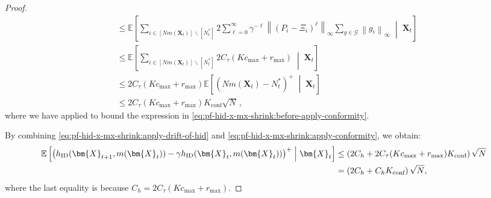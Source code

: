 \documentclass{article}
\theoremstyle{plain}
\theoremstyle{remark}
\newcommand{\norm}[1]{\left\lVert#1\right\rVert}
\newcommand{\givenmiddle}{\;\middle|\;}
\newcommand{\sumell}{\sum_{\ell=0}^\infty}
\newcommand{\Ctau}{C_\tau}
\newcommand{\ID}{\textnormal{ID}}
\newcommand{\conf}{\text{conf}}
\def\mX{{\bm{X}}}
\newcommand{\EE}{\mathbb{E}}
\newcommand{\bracket}[1]{\left(#1\right)}
\newcommand{\mbracket}[1]{\left[#1\right]}
\begin{document}
\begin{proof}
\begin{align}
        \nonumber
        &\leq \EE\mbracket{\sum_{i\in[Nm(\mX_t)]\backslash[N_t^*]} 2 \sumell \gamma^{-\ell}\norm{(P_i-\Xi_i)^{\ell}}_\infty \sum_{g\in \mathcal{G}}\norm{g_i}_\infty \givenmiddle\mX_t}\\
        \nonumber
        &\leq \EE\mbracket{\sum_{i\in[Nm(\mX_t)]\backslash[N_t^*]}2\Ctau(Kc_{\max}+r_{\max})\givenmiddle\mX_t}\\
        \label{eq:pf-hid-x-mx-shrink:before-apply-conformity}
        &\leq 2\Ctau(Kc_{\max}+r_{\max}) \EE\mbracket{(Nm(\mX_t)-N_t^*)^+\givenmiddle\mX_t}\\
        \label{eq:pf-hid-x-mx-shrink:apply-conformity}
        &\leq 2 \Ctau(Kc_{\max}+r_{\max})K_{\conf}\sqrt{N}\,,
    \end{align}
    where we have applied  to bound the expression in \eqref{eq:pf-hid-x-mx-shrink:before-apply-conformity}.  
    
    By combining \eqref{eq:pf-hid-x-mx-shrink:apply-drift-of-hid} and \eqref{eq:pf-hid-x-mx-shrink:apply-conformity}, we obtain:  
    \begin{align*}
        \EE\mbracket{\bracket{h_{\ID}(\mX_{t+1},m(\mX_t))-\gamma h_{\ID}(\mX_t,m(\mX_t))}^+\givenmiddle\mX_t}&\leq \left(2C_h+ 2\Ctau(Kc_{\max}+r_{\max})K_{\conf}\right)\sqrt{N} \\
        &= \left(2C_h+ C_h K_{\conf}\right)\sqrt{N},
    \end{align*}
    where the last equality is because $C_h = 2 \Ctau(Kc_{\max} + r_{\max})$. 
\end{proof}
\end{document}
